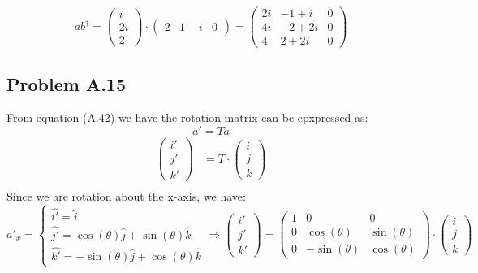 \documentclass{article}
\begin{document}
\begin{equation*}
    a b^\dagger =
    \begin{pmatrix}
        i \\
        2i \\
        2
    \end{pmatrix}
    \cdot
    \begin{pmatrix}
        2 & 1+i & 0
    \end{pmatrix}
    = 
    \begin{pmatrix}
        2i & -1 + i & 0 \\
        4i & -2 + 2i & 0 \\
        4 & 2 + 2i & 0
    \end{pmatrix}
\end{equation*}
\subsection*{Problem A.15}
From equation (A.42) we have the rotation matrix can be epxpressed as: 
\[a' = Ta\] 
\begin{align*}
    \begin{pmatrix}
        i' \\
        j' \\
        k'
    \end{pmatrix}
    &= 
    T \cdot
    \begin{pmatrix}
        i \\
        j \\
        k
    \end{pmatrix} \\
\end{align*}
Since we are rotation about the x-axis, we have:
\begin{equation*}
    a'_x =
    \begin{cases}
    \hat{i'} = \hat{i} \\
    \hat{j'} = \cos(\theta) \hat{j} + \sin(\theta) \hat{k} \\
    \hat{k'} = -\sin(\theta) \hat{j} + \cos(\theta) \hat{k}
    \end{cases}
    \Rightarrow
    \begin{pmatrix}
        i' \\
        j' \\
        k'
    \end{pmatrix}
    =
    \begin{pmatrix}
        1 & 0 & 0 \\
        0 & \cos(\theta) & \sin(\theta) \\
        0 & -\sin(\theta) & \cos(\theta)
    \end{pmatrix}
    \cdot
    \begin{pmatrix}
        i \\
        j \\
        k
    \end{pmatrix}
\end{equation*}
\end{document}
